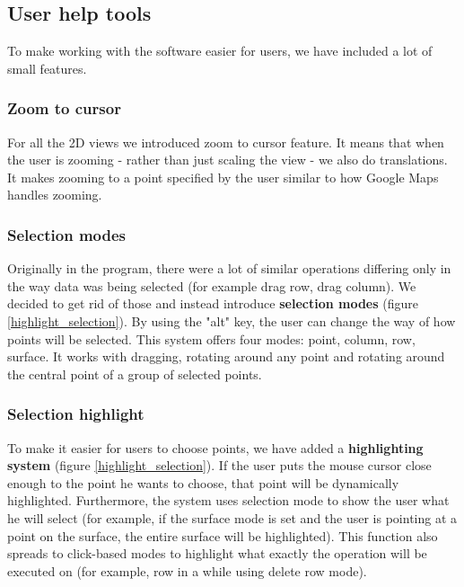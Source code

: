 \documentclass[a4paper, 11pt, article]{report}
\begin{document}
\subsection{User help tools}

To make working with the software easier for users, we have included a lot of small features.

\subsubsection{Zoom to cursor}

For all the 2D views we introduced zoom to cursor feature. It means that when the user is zooming - rather than just scaling the view - we also do translations. It makes zooming to a point specified by the user similar to how Google Maps handles zooming.

\subsubsection{Selection modes}

Originally in the program, there were a lot of similar operations differing only in the way data was being selected (for example drag row, drag column). We decided to get rid of those and instead introduce \textbf{selection modes} (figure \ref{highlight_selection}). By using the "alt" key, the user can change the way of how points will be selected. This system offers four modes: point, column, row, surface. It works with dragging, rotating around any point and rotating around the central point of a group of selected points.

\subsubsection{Selection highlight}

To make it easier for users to choose points, we have added a \textbf{highlighting system} (figure \ref{highlight_selection}). If the user puts the mouse cursor close enough to the point he wants to choose, that point will be dynamically highlighted. Furthermore, the system uses selection mode to show the user what he will select (for example, if the surface mode is set and the user is pointing at a point on the surface, the entire surface will be highlighted). This function also spreads to click-based modes to highlight what exactly the operation will be executed on (for example, row in a while using delete row mode).
\end{document}
